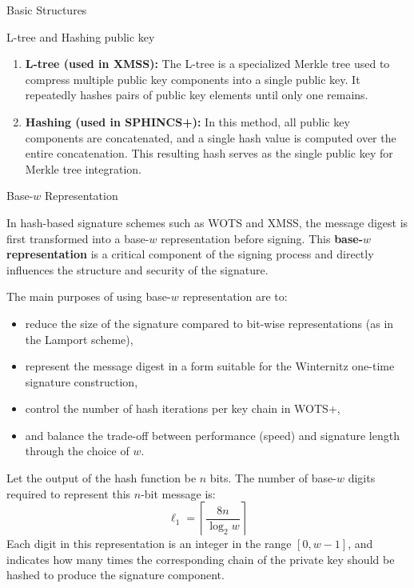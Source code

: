 \documentclass [version=submission]{iacrcc}
\begin{document}
\begin{section}{Basic Structures}{\label{sec1}}
\begin{subsection}{L-tree and Hashing public key}{\label{sec:L-tree}}
    \begin{enumerate}
        \item \textbf{L-tree (used in XMSS):} The L-tree is a specialized Merkle tree used to compress multiple public key components into a single public key. It repeatedly hashes pairs of public key elements until only one remains.
    
        \item \textbf{Hashing (used in SPHINCS+):} In this method, all public key components are concatenated, and a single hash value is computed over the entire concatenation. This resulting hash serves as the single public key for Merkle tree integration.
    \end{enumerate}

    
\end{subsection}

\begin{subsection}{Base-\texorpdfstring{$w$}{w} Representation }

In hash-based signature schemes such as WOTS and XMSS, the message digest is first transformed into a base-$w$ representation before signing. This \textbf{base-$w$ representation} is a critical component of the signing process and directly influences the structure and security of the signature.

The main purposes of using base-$w$ representation are to:

\begin{itemize}
    \item reduce the size of the signature compared to bit-wise representations (as in the Lamport scheme),
    \item represent the message digest in a form suitable for the Winternitz one-time signature construction,
    \item control the number of hash iterations per key chain in WOTS+,
    \item and balance the trade-off between performance (speed) and signature length through the choice of $w$.
\end{itemize}

Let the output of the hash function be $n$ bits. The number of base-$w$ digits required to represent this $n$-bit message is:
\[
\ell_1 = \left\lceil \frac{8n}{\log_2 w} \right\rceil
\]
Each digit in this representation is an integer in the range $[0, w-1]$, and indicates how many times the corresponding chain of the private key should be hashed to produce the signature component.


\end{subsection}
\end{section}
\end{document}
